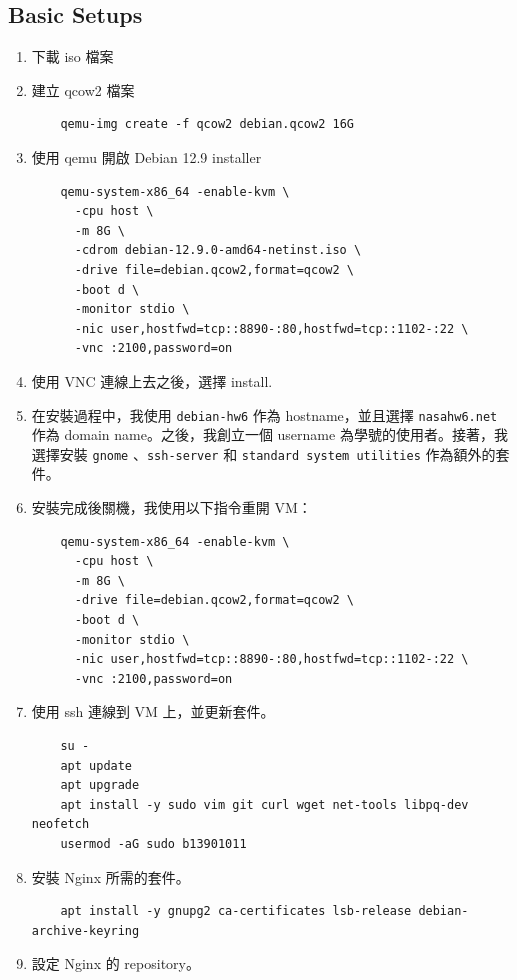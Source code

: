 \documentclass[12pt]{article}
\begin{document}
\subsection{Basic Setups}
\begin{enumerate}
  \item 下載 iso 檔案
  \item 建立 qcow2 檔案
  \begin{verbatim}
    qemu-img create -f qcow2 debian.qcow2 16G
  \end{verbatim}
  \item 使用 qemu 開啟 Debian 12.9 installer
  \begin{verbatim}
    qemu-system-x86_64 -enable-kvm \
      -cpu host \
      -m 8G \
      -cdrom debian-12.9.0-amd64-netinst.iso \
      -drive file=debian.qcow2,format=qcow2 \
      -boot d \
      -monitor stdio \
      -nic user,hostfwd=tcp::8890-:80,hostfwd=tcp::1102-:22 \
      -vnc :2100,password=on  
  \end{verbatim}
  \item 使用 VNC 連線上去之後，選擇 install.
  \item 在安裝過程中，我使用 \texttt{debian-hw6} 作為 hostname，並且選擇 \texttt{nasahw6.net} 作為 domain name。之後，我創立一個 username 為學號的使用者。接著，我選擇安裝 \texttt{gnome} 、\texttt{ssh-server} 和 \texttt{standard system utilities} 作為額外的套件。
  \item 安裝完成後關機，我使用以下指令重開 VM：
  \begin{verbatim}
    qemu-system-x86_64 -enable-kvm \
      -cpu host \
      -m 8G \
      -drive file=debian.qcow2,format=qcow2 \
      -boot d \
      -monitor stdio \
      -nic user,hostfwd=tcp::8890-:80,hostfwd=tcp::1102-:22 \
      -vnc :2100,password=on
  \end{verbatim}
  \item 使用 ssh 連線到 VM 上，並更新套件。
  \begin{verbatim}
    su -
    apt update
    apt upgrade
    apt install -y sudo vim git curl wget net-tools libpq-dev neofetch
    usermod -aG sudo b13901011
  \end{verbatim}
  \item 安裝 Nginx 所需的套件。
  \begin{verbatim}
    apt install -y gnupg2 ca-certificates lsb-release debian-archive-keyring
  \end{verbatim}
  \item 設定 Nginx 的 repository。
  \begin{verbatim}

\end{verbatim}
\end{enumerate}
\end{document}
